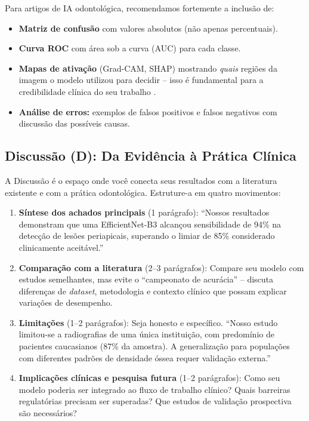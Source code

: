 Para artigos de IA odontológica, recomendamos fortemente a inclusão de:

\begin{itemize}
  \item \textbf{Matriz de confusão} com valores absolutos (não apenas
    percentuais).
  \item \textbf{Curva ROC} com área sob a curva (AUC) para cada classe.
  \item \textbf{Mapas de ativação} (Grad-CAM, SHAP) mostrando \textit{quais}
    regiões da imagem o modelo utilizou para decidir -- isso é fundamental para
    a credibilidade clínica do seu trabalho \cite{selvaraju2017grad}.
  \item \textbf{Análise de erros:} exemplos de falsos positivos e falsos
    negativos com discussão das possíveis causas.
\end{itemize}

\subsection{Discussão (D): Da Evidência à Prática Clínica}

A Discussão é o espaço onde você conecta seus resultados com a literatura
existente e com a prática odontológica. Estruture-a em quatro movimentos:

\begin{enumerate}
  \item \textbf{Síntese dos achados principais} (1 parágrafo): ``Nossos
    resultados demonstram que uma EfficientNet-B3 alcançou sensibilidade de 94\%
    na detecção de lesões periapicais, superando o limiar de 85\% considerado
    clinicamente aceitável.''

  \item \textbf{Comparação com a literatura} (2--3 parágrafos): Compare seu
    modelo com estudos semelhantes, mas evite o ``campeonato de acurácia'' --
    discuta diferenças de \textit{dataset}, metodologia e contexto clínico que
    possam explicar variações de desempenho.

  \item \textbf{Limitações} (1--2 parágrafos): Seja honesto e específico.
    ``Nosso estudo limitou-se a radiografias de uma única instituição, com
    predomínio de pacientes caucasianos (87\% da amostra). A generalização para
    populações com diferentes padrões de densidade óssea requer validação
    externa.''

  \item \textbf{Implicações clínicas e pesquisa futura} (1--2 parágrafos):
    Como seu modelo poderia ser integrado ao fluxo de trabalho clínico? Quais
    barreiras regulatórias precisam ser superadas? Que estudos de validação
    prospectiva são necessários?
\end{enumerate}


